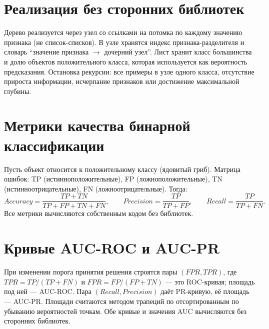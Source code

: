 \documentclass[12pt,a4paper]{article}
\begin{document}
\section{Реализация без сторонних библиотек}
Дерево реализуется через узел со ссылками на потомка по каждому значению признака (не список-списков). В узле хранятся индекс признака-разделителя и словарь ``значение признака $\rightarrow$ дочерний узел''. Лист хранит класс большинства и долю объектов положительного класса, которая используется как вероятность предсказания. Остановка рекурсии: все примеры в узле одного класса, отсутствие прироста информации, исчерпание признаков или достижение максимальной глубины.

\section{Метрики качества бинарной классификации}
Пусть объект относится к положительному классу (ядовитый гриб). Матрица ошибок: TP (истинноположительные), FP (ложноположительные), TN (истинноотрицательные), FN (ложноотрицательные). Тогда:
\[
Accuracy = \frac{TP+TN}{TP+FP+TN+FN}, \qquad
Precision = \frac{TP}{TP+FP}, \qquad
Recall = \frac{TP}{TP+FN}.
\]
Все метрики вычисляются собственным кодом без библиотек.

\section{Кривые AUC-ROC и AUC-PR}
При изменении порога принятия решения строятся пары $(FPR, TPR)$, где $TPR = TP/(TP+FN)$ и $FPR = FP/(FP+TN)$ --- это ROC-кривая; площадь под ней --- AUC-ROC. Пара $(Recall, Precision)$ даёт PR-кривую, её площадь --- AUC-PR. Площади считаются методом трапеций по отсортированным по убыванию вероятностей точкам. Обе кривые и значения AUC вычисляются без сторонних библиотек.
\end{document}
